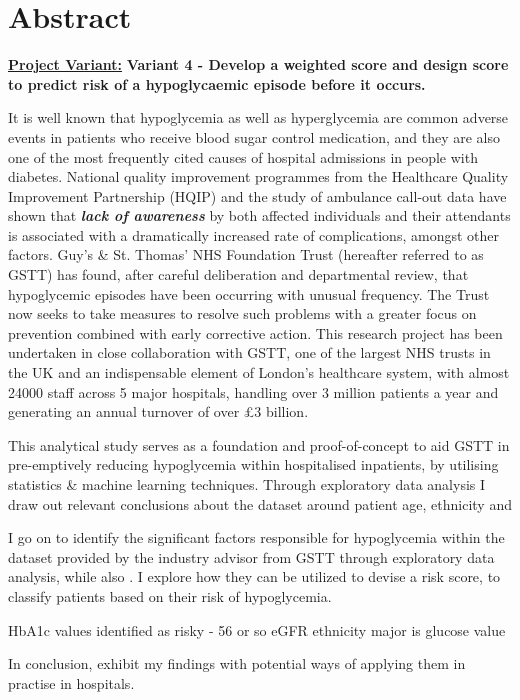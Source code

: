 
\section*{Abstract}


    \textbf{\underline{Project Variant:}} \textbf{ Variant 4 - Develop a weighted score and design score to predict risk of a hypoglycaemic episode before it occurs.} 

    \vspace{10pt}
    \par{ \noindent It is well known that hypoglycemia as well as hyperglycemia are common adverse events in patients who receive blood sugar control medication, and they are also one of the most frequently cited causes of hospital admissions in people with diabetes. National quality improvement programmes from the Healthcare Quality Improvement Partnership (HQIP) and the study of ambulance call-out data have shown that \textbf{\textit{lack of awareness}} by both affected individuals and their attendants is associated with a dramatically increased rate of complications, amongst other factors. Guy's \& St. Thomas' NHS Foundation Trust (hereafter referred to as GSTT) has found, after careful deliberation and departmental review, that hypoglycemic episodes have been occurring with unusual frequency. The Trust now seeks to take measures to resolve such problems with a greater focus on prevention combined with early corrective action. This research project has been undertaken in close collaboration with GSTT, one of the largest NHS trusts in the UK and an indispensable element of London's healthcare system, with almost 24000 staff across 5 major hospitals, handling over 3 million patients a year and generating an annual turnover of over \pounds3 billion.}

    \vspace{10pt}
    \par{ \noindent This analytical study serves as a foundation and proof-of-concept to aid GSTT in pre-emptively reducing hypoglycemia within hospitalised inpatients, by utilising statistics \& machine learning techniques. Through exploratory data analysis I draw out relevant conclusions about the dataset around patient age, ethnicity and 
    
    I go on to identify the significant factors responsible for hypoglycemia within the dataset provided by the industry advisor from GSTT through exploratory data analysis, while also . I explore how they can be utilized to devise a risk score, to classify patients based on their risk of hypoglycemia. 
    
    HbA1c values identified as risky - 56 or so 
    eGFR 
    ethnicity
    major is glucose value 
    
 In conclusion, exhibit my findings with potential ways of applying them in practise in hospitals.}

